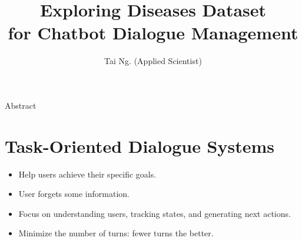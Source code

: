 \documentclass[10pt]{beamer}
\title{Exploring Diseases Dataset \\for Chatbot Dialogue Management}
\author{Tai Ng. (Applied Scientist)}
\institute{VINBRAIN INTERNSHIP PROGRAM 2021 }
\begin{document}
\maketitle

\begin{frame}{Abstract}
	\section{Task-Oriented Dialogue Systems}
	\begin{itemize}
		\item Help users achieve their specific goals.
		\item User forgets some information.
		\item Focus on understanding users, tracking states, and
		generating next actions.
		\item Minimize the number of turns: fewer turns the better.
	\end{itemize}
	
\end{frame}




\end{document}
